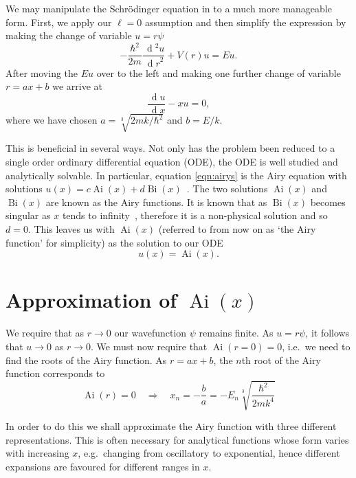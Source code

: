 \documentclass[]{article}
\renewcommand{\d}[1]{\ensuremath{\,\operatorname{d}\!{#1}}}
\newcommand{\Ai}[1]{\ensuremath{\operatorname{Ai}({#1})}}
\newcommand{\Bi}[1]{\ensuremath{\operatorname{Bi}({#1})}}
\begin{document}
We may manipulate the Schr\"{o}dinger equation in to a much more manageable form. First, we apply our $\ell = 0$ assumption and then simplify the expression by making the change of variable $u = r\psi$
\[
-\frac{\hbar^{2}}{2m}
 \frac{\d{^{2}u}}{\d{r}^{2}}
+ V(r)u = Eu.
\]
After moving the $Eu$ over to the left and making one further change of variable $r = ax + b$ we  arrive at
\begin{equation}\label{eqn:airys}
\frac{\d{u}}{\d{x}} - xu = 0,
\end{equation}
where we have chosen $a = \sqrt[3]{2mk/\hbar^{2}}$ and $b = E/k$.

This is beneficial in several ways. Not only has the problem been reduced to a single order ordinary differential equation (ODE), the ODE is well studied and analytically solvable. In particular, equation \ref{eqn:airys} is the Airy equation with solutions $u(x) = c\Ai{x} + d\Bi{x}$~\cite{ref:abramowitz}. The two solutions $\Ai{x}$ and $\Bi{x}$ are known as the Airy functions. It is known that as $\Bi{x}$ becomes singular as $x$ tends to infinity~\cite{ref:abramowitz}, therefore it is a non-physical solution and so $d = 0$. This leaves us with $\Ai{x}$ (referred to from now on as `the Airy function' for simplicity) as the solution to our ODE\footnotemark
\[
u(x) = \Ai{x}.
\]

\footnotetext{$\Ai{x} \to 0$ as $x \to \pm\infty$.}



\section{Approximation of \Ai{x}}\label{sec:approximation}

We require that as $r \to 0$ our wavefunction $\psi$ remains finite. As $u = r\psi$, it follows that $u \to 0$ as $r \to 0$. We must now require that $\Ai{r = 0} = 0$, i.e.\ we need to find the roots of the Airy function. As $r = ax + b$, the $n$th root of the Airy function corresponds to
\begin{equation}\label{eqn:rootexpression}
\Ai{r} = 0 \quad\Rightarrow\quad x_{n} = -\frac{b}{a} = -E_{n}\sqrt[3]{\frac{\hbar^{2}}{2mk^{4}}}
\end{equation}

In order to do this we shall approximate the Airy function with three different representations. This is often necessary for analytical functions whose form varies with increasing $x$, e.g.\ changing from oscillatory to exponential, hence different expansions are favoured for different ranges in $x$.
\end{document}
